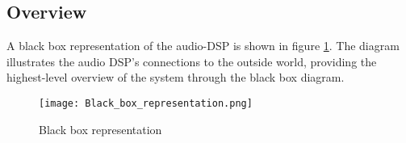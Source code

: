 \subsection{Overview}
A black box representation of the audio-DSP is shown in figure \ref{fig:Black-box-rep}. The diagram illustrates the audio DSP's connections to the outside world, providing the highest-level overview of the system through the black box diagram.
\begin{figure}[ht]
    \texttt{[image: Black\_box\_representation.png]}
    \caption{Black box representation}
    \label{fig:Black-box-rep}
\end{figure}